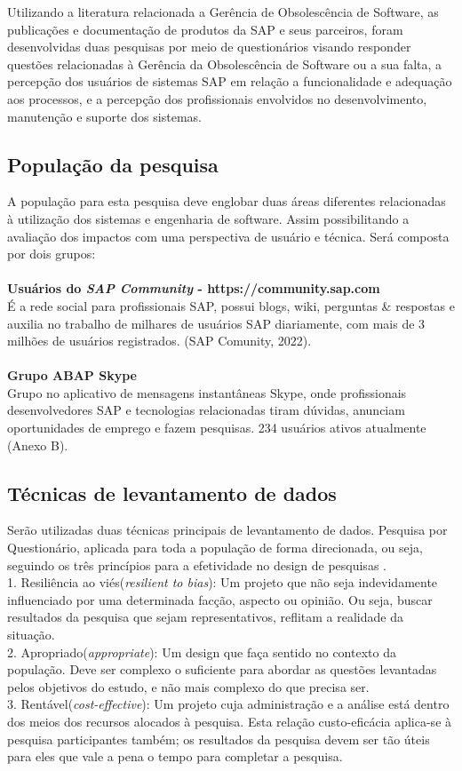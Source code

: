 Utilizando a literatura relacionada a Gerência de Obsolescência de Software, as publicações e documentação de produtos da SAP e seus parceiros, foram desenvolvidas duas pesquisas por meio de questionários visando responder questões relacionadas à Gerência da Obsolescência de Software ou a sua falta, a percepção dos usuários de sistemas SAP em relação a funcionalidade e adequação aos processos, e a percepção dos profissionais envolvidos no desenvolvimento, manutenção e suporte dos sistemas.

\subsection{\esp População da pesquisa }

A população para esta pesquisa deve englobar duas áreas diferentes relacionadas à utilização dos sistemas e engenharia de software. Assim possibilitando a avaliação dos impactos com uma perspectiva de usuário e técnica. Será composta por dois grupos:\\\\
\textbf{Usuários do \textit{SAP Community} - https://community.sap.com\\}
É a rede social para profissionais SAP, possui blogs, wiki, perguntas \& respostas e auxilia no trabalho de milhares de usuários SAP diariamente, com mais de 3 milhões de usuários registrados. (SAP Comunity, 2022).\\\\
\textbf{Grupo ABAP Skype}\\
Grupo no aplicativo de mensagens instantâneas Skype, onde profissionais desenvolvedores SAP e tecnologias relacionadas tiram dúvidas, anunciam oportunidades de emprego e fazem pesquisas. 234 usuários ativos atualmente (Anexo B).\\

\subsection{\esp Técnicas de levantamento de dados }

Serão utilizadas duas técnicas principais de levantamento de dados. Pesquisa por Questionário, aplicada para toda a população de forma direcionada, ou seja, seguindo os três princípios para a efetividade no design de pesquisas \cite{Kitchenham}.\\
1. Resiliência ao viés(\textit{resilient to bias}): Um projeto que não seja indevidamente influenciado por uma determinada facção, aspecto ou opinião. Ou seja, buscar resultados da pesquisa que sejam representativos, reflitam a realidade da situação.\\
2. Apropriado(\textit{appropriate}): Um design que faça sentido no contexto da população. 
Deve ser complexo o suficiente para abordar as questões levantadas pelos objetivos do estudo, e não mais complexo do que precisa ser.\\
3. Rentável(\textit{cost-effective}): Um projeto cuja administração e a análise está dentro dos meios dos recursos alocados à pesquisa. Esta relação custo-eficácia aplica-se à pesquisa participantes também; os resultados da pesquisa devem ser tão úteis para eles que vale a pena o tempo para completar a pesquisa.


